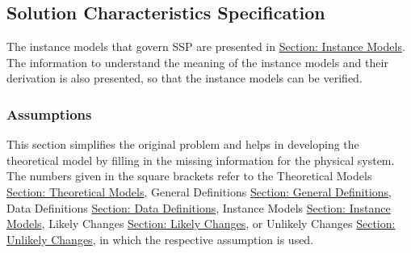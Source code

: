 \documentclass[12pt]{article}
\begin{document}
\subsection{Solution Characteristics Specification}
\label{Sec:SolCharSpec}
The instance models that govern SSP are presented in \hyperref[Sec:IMs]{Section: Instance Models}. The information to understand the meaning of the instance models and their derivation is also presented, so that the instance models can be verified.
\subsubsection{Assumptions}
\label{Sec:Assumps}
This section simplifies the original problem and helps in developing the theoretical model by filling in the missing information for the physical system. The numbers given in the square brackets refer to the Theoretical Models \hyperref[Sec:TMs]{Section: Theoretical Models}, General Definitions \hyperref[Sec:GDs]{Section: General Definitions}, Data Definitions \hyperref[Sec:DDs]{Section: Data Definitions}, Instance Models \hyperref[Sec:IMs]{Section: Instance Models}, Likely Changes \hyperref[Sec:LCs]{Section: Likely Changes}, or Unlikely Changes \hyperref[Sec:UCs]{Section: Unlikely Changes}, in which the respective assumption is used.
\end{document}
